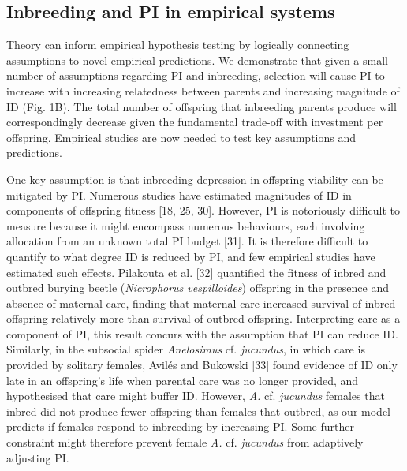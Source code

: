 \documentclass[12pt]{article}
\begin{document}
\subsection*{Inbreeding and PI in empirical systems}

Theory can inform empirical hypothesis testing by logically connecting assumptions to novel empirical predictions. We demonstrate that given a small number of assumptions regarding PI and inbreeding, selection will cause PI to increase with increasing relatedness between parents and increasing magnitude of ID (Fig. 1B). The total number of offspring that inbreeding parents produce will correspondingly decrease given the fundamental trade-off with investment per offspring. Empirical studies are now needed to test key assumptions and predictions.

One key assumption is that inbreeding depression in offspring viability can be mitigated by PI. Numerous studies have estimated magnitudes of ID in components of offspring fitness [18, 25, 30]. However, PI is notoriously difficult to measure because it might encompass numerous behaviours, each involving allocation from an unknown total PI budget [31]. It is therefore difficult to quantify to what degree ID is reduced by PI, and few empirical studies have estimated such effects. Pilakouta et al. [32] quantified the fitness of inbred and outbred burying beetle (\textit{Nicrophorus vespilloides}) offspring in the presence and absence of maternal care, finding that maternal care increased survival of inbred offspring relatively more than survival of outbred offspring. Interpreting care as a component of PI, this result concurs with the assumption that PI can reduce ID. Similarly, in the subsocial spider \textit{Anelosimus} cf. \textit{jucundus}, in which care is provided by solitary females, Avil{\'{e}}s and Bukowski [33] found evidence of ID only late in an offspring's life when parental care was no longer provided, and hypothesised that care might buffer ID. However, \textit{A.} cf. \textit{jucundus} females that inbred did not produce fewer offspring than females that outbred, as our model predicts if females respond to inbreeding by increasing PI. Some further constraint might therefore prevent female \textit{A.} cf. \textit{jucundus} from adaptively adjusting PI.
\end{document}
